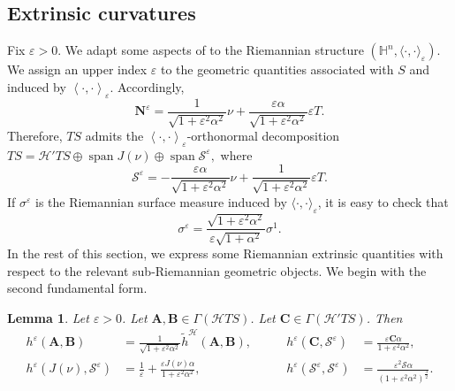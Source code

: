 \documentclass[11pt]{amsart}
\newcommand{\hhh}{{\mathcal{H}}}
\newcommand{\A}{\mathbf{A}}
\newcommand{\B}{\mathbf{B}}
\newcommand{\C}{\mathbf{C}}
\newcommand{\n}[1]{\nabla^\varepsilon_{ #1 }}
\newcommand{\vh}{\nu}
\newcommand{\hh}{{\mathbb{H}}}
\newcommand{\eps}{\varepsilon}
\newcommand{\s}{\mathcal S}
\renewcommand{\n}{\mathbf{N}}
\DeclareMathOperator{\spann}{span}
\newtheorem{lemma}[theorem]{Lemma}
\theoremstyle{definition}
\theoremstyle{remark}
\numberwithin{equation}{section}
\begin{document}
   \subsection{Extrinsic curvatures}\label{sec_extrinsiccurvaturesriemapp} Fix $\eps>0$. We adapt some aspects of  to the Riemannian structure $(\hh^n,\langle\cdot,\cdot\rangle_\eps).$
We assign an upper index $\eps$ to the geometric quantities associated with $S$ and induced by $\left\langle\cdot,\cdot\right\rangle_\eps$. Accordingly,
\begin{equation}\label{normaleriemannianaepsilon}
    \n^\eps=\frac{1}{\sqrt{1+\eps^2\alpha^2}}\vh+\frac{\eps\alpha}{\sqrt{1+\eps^2\alpha^2}}\eps T.
\end{equation}
Therefore, $TS$ admits the $\left\langle\cdot,\cdot\right\rangle_\eps$-orthonormal  decomposition $TS=\hhh' TS\oplus\spann J(\vh)\oplus\spann \s^\eps,$ 
where 
\begin{equation}\label{formadiesseepsilon}
    \s^\eps=-\frac{\eps\alpha}{\sqrt{1+\eps^2\alpha^2}}\vh+\frac{1}{\sqrt{1+\eps^2\alpha^2}}\eps T.
\end{equation}
If $\sigma^\eps$ is the Riemannian surface measure induced by $\langle\cdot,\cdot\rangle_\eps$, it is easy to check that 
\begin{equation}\label{areaelementeps}
    \sigma^\eps=\frac{\sqrt{1+\eps^2\alpha^2}}{\eps\sqrt{1+\alpha^2}}\sigma^1.
\end{equation}
In the rest of this section, we express some Riemannian extrinsic quantities with respect to the relevant sub-Riemannian geometric objects. We begin with the second fundamental form.
\begin{lemma}\label{lemmasecondaformafondriem}
    Let $\eps>0$. Let $\A,\B\in\Gamma(\hhh T S)$. Let $\C\in\Gamma(\hhh'TS)$. Then
    \begin{equation}\label{formaepsenonepstuttoorizz}
        \begin{alignedat}{2}                  h^\eps(\A,\B)&=\frac{1}{\sqrt{1+\eps^2\alpha^2}}\tilde h^\hhh(\A,\B),&\qquad
        h^\eps(\C,\s^\eps)&=\frac{\eps\C\alpha}{1+\eps^2\alpha^2},\\
        h^\eps(J(\vh),\s^\eps)&=\frac{1}{\eps}+\frac{\eps J(\vh)\alpha}{1+\eps^2\alpha^2},&\qquad h^\eps(\s^\eps,\s^\eps)&=\frac{\eps^2\s\alpha}{\left(1+\eps^2\alpha^2\right)^{\frac{3}{2}}}.
        \end{alignedat}
    \end{equation}
\end{lemma}
\end{document}
